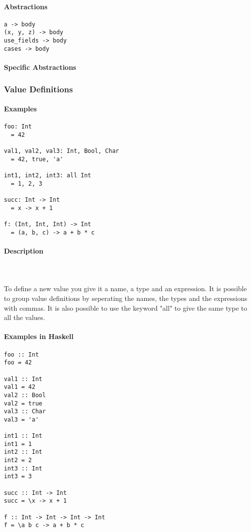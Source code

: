 \documentclass{article}
\def\H{Haskell}
\begin{document}
\paragraph{Abstractions}

\begin{verbatim}
a -> body
(x, y, z) -> body
use_fields -> body
cases -> body
\end{verbatim}

\paragraph{Specific Abstractions}

\subsubsection{Value Definitions}

\paragraph{Examples}

\begin{verbatim}
foo: Int
  = 42

val1, val2, val3: Int, Bool, Char
  = 42, true, 'a'

int1, int2, int3: all Int
  = 1, 2, 3

succ: Int -> Int
  = x -> x + 1

f: (Int, Int, Int) -> Int
  = (a, b, c) -> a + b * c
\end{verbatim}

\paragraph{Description}\mbox{} \\\\
To define a new value you give it a name, a type and an expression. It is possible
to group value definitions by seperating the names, the types and the expressions
with commas. It is also possible to use the keyword "all" to give the same type
to all the values.

\paragraph{Examples in \H}

\begin{verbatim}
foo :: Int
foo = 42

val1 :: Int
val1 = 42
val2 :: Bool
val2 = true
val3 :: Char
val3 = 'a'

int1 :: Int
int1 = 1
int2 :: Int
int2 = 2
int3 :: Int
int3 = 3

succ :: Int -> Int
succ = \x -> x + 1

f :: Int -> Int -> Int -> Int
f = \a b c -> a + b * c
\end{verbatim}
\end{document}
